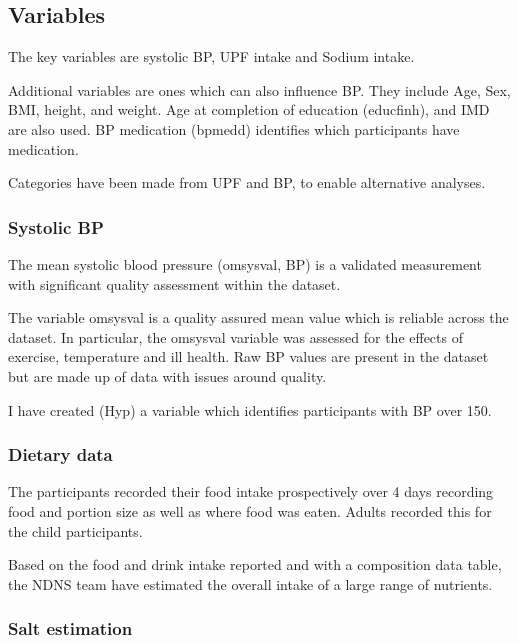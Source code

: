 \documentclass[
]{article}
\begin{document}
\hypertarget{variables}{%
\subsection{Variables}\label{variables}}

The key variables are systolic BP, UPF intake and Sodium intake.

Additional variables are ones which can also influence BP. They include
Age, Sex, BMI, height, and weight. Age at completion of education
(educfinh), and IMD are also used. BP medication (bpmedd) identifies
which participants have medication.

Categories have been made from UPF and BP, to enable alternative
analyses.

\hypertarget{systolic-bp}{%
\subsubsection{Systolic BP}\label{systolic-bp}}

The mean systolic blood pressure (omsysval, BP) is a validated
measurement with significant quality assessment within the dataset.

The variable omsysval is a quality assured mean value which is reliable
across the dataset. In particular, the omsysval variable was assessed
for the effects of exercise, temperature and ill health. Raw BP values
are present in the dataset but are made up of data with issues around
quality.

I have created (Hyp) a variable which identifies participants with BP
over 150.

\hypertarget{dietary-data}{%
\subsubsection{Dietary data}\label{dietary-data}}

The participants recorded their food intake prospectively over 4 days
recording food and portion size as well as where food was eaten. Adults
recorded this for the child participants.

Based on the food and drink intake reported and with a composition data
table, the NDNS team have estimated the overall intake of a large range
of nutrients.

\hypertarget{salt-estimation}{%
\subsubsection{Salt estimation}\label{salt-estimation}}
\end{document}
